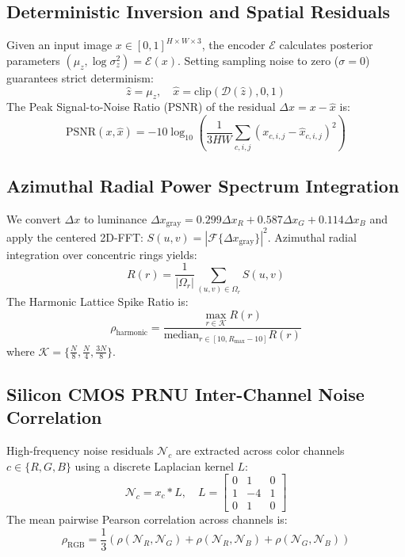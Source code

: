 \documentclass[conference]{IEEEtran}
\begin{document}
\subsection{Deterministic Inversion and Spatial Residuals}
Given an input image $x \in [0, 1]^{H \times W \times 3}$, the encoder $\mathcal{E}$ calculates posterior parameters $(\mu_z, \log \sigma_z^2) = \mathcal{E}(x)$. Setting sampling noise to zero ($\sigma = 0$) guarantees strict determinism:
\begin{equation}
\hat{z} = \mu_z, \quad \hat{x} = \text{clip}\left(\mathcal{D}(\hat{z}), 0, 1\right)
\end{equation}
The Peak Signal-to-Noise Ratio (PSNR) of the residual $\Delta x = x - \hat{x}$ is:
\begin{equation}
\text{PSNR}(x, \hat{x}) = -10 \log_{10}\left(\frac{1}{3HW}\sum_{c, i, j}(x_{c, i, j} - \hat{x}_{c, i, j})^2\right)
\end{equation}

\subsection{Azimuthal Radial Power Spectrum Integration}
We convert $\Delta x$ to luminance $\Delta x_{\text{gray}} = 0.299 \Delta x_R + 0.587 \Delta x_G + 0.114 \Delta x_B$ and apply the centered 2D-FFT: $S(u, v) = |\mathcal{F}\{\Delta x_{\text{gray}}\}|^2$. Azimuthal radial integration over concentric rings yields:
\begin{equation}
R(r) = \frac{1}{|\Omega_r|} \sum_{(u, v) \in \Omega_r} S(u, v)
\end{equation}
The Harmonic Lattice Spike Ratio is:
\begin{equation}
\rho_{\text{harmonic}} = \frac{\max_{r \in \mathcal{K}} R(r)}{\text{median}_{r \in [10, R_{\max}-10]} R(r)}
\end{equation}
where $\mathcal{K} = \{ \frac{N}{8}, \frac{N}{4}, \frac{3N}{8} \}$.

\subsection{Silicon CMOS PRNU Inter-Channel Noise Correlation}
High-frequency noise residuals $\mathcal{N}_c$ are extracted across color channels $c \in \{R, G, B\}$ using a discrete Laplacian kernel $L$:
\begin{equation}
\mathcal{N}_c = x_c * L, \quad L = \begin{bmatrix} 0 & 1 & 0 \\ 1 & -4 & 1 \\ 0 & 1 & 0 \end{bmatrix}
\end{equation}
The mean pairwise Pearson correlation across channels is:
\begin{equation}
\rho_{\text{RGB}} = \frac{1}{3}\left(\rho(\mathcal{N}_R, \mathcal{N}_G) + \rho(\mathcal{N}_R, \mathcal{N}_B) + \rho(\mathcal{N}_G, \mathcal{N}_B)\right)
\end{equation}
\end{document}
